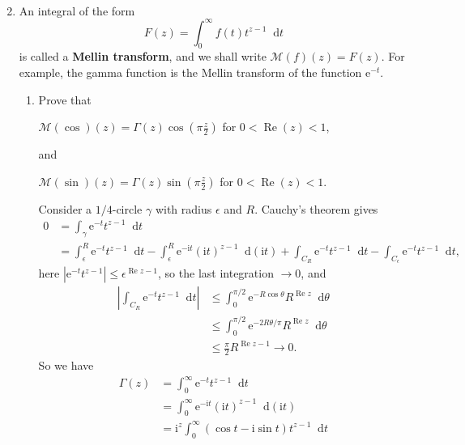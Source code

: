 \documentclass[11pt]{report}
\theoremstyle{mythm}
\let\oldendproof\endproof
\renewenvironment{proof}[1][\proofname]{%
  \oldproof[\normalfont \bfseries #1]%
}{\oldendproof}
\renewcommand*{\proofname}{Proof}
\theoremstyle{myans}
\newcommand{\mi}{\mathrm{i}}
\newcommand{\me}{\mathrm{e}}
\newcommand{\dd}{\mathop{}\!\mathrm{d}}
\renewcommand{\Re}{\operatorname{Re}}
\begin{document}
\begin{enumerate}
\begin{enumerate}
\begin{proof}
\begin{align*}
      \end{align*}
    \end{proof}
  \end{enumerate}
  \setcounter{enumi}{9}
  \item An integral of the form
  \[ F(z) = \int_0^\infty f(t) t^{z-1} \dd t \]
  is called a \textbf{Mellin transform}, and we shall write $\mathcal M(f)(z) = F(z)$. For example,
  the gamma function is the Mellin transform of the function $\me^{-t}$.
  \begin{enumerate}
    \item Prove that
    \begin{center}
      $\displaystyle\mathcal M(\cos)(z) = \Gamma(z) \cos \left(\pi \frac z 2\right)$
      \quad for $0 < \Re(z) < 1$,
    \end{center}
    and
    \begin{center}
      $\displaystyle\mathcal M(\sin)(z) = \Gamma(z) \sin \left(\pi \frac z 2\right)$
      \quad for $0 < \Re(z) < 1$.
    \end{center}
    \begin{proof}
      Consider a $1/4$-circle $\gamma$ with radius $\epsilon$ and $R$.
      Cauchy's theorem gives
      \begin{align*}
        0 &= \int_\gamma \me^{-t} t^{z-1} \dd t\\
        &= \int_\epsilon^R \me^{-t} t^{z-1} \dd t
        - \int_\epsilon^R \me^{-\mi t} (\mi t)^{z-1} \dd (\mi t)
        + \int_{C_R} \me^{-t} t^{z-1} \dd t - \int_{C_\epsilon}\me^{-t} t^{z-1} \dd t,
      \end{align*}
      here $|\me^{-t}t^{z-1}|\leq \epsilon^{\Re z - 1}$, so the last integration $\to 0$, and
      \begin{align*}
        \left| \int_{C_R} \me^{-t} t^{z-1} \dd t \right| &\leq 
        \int_0^{\pi/2} \me^{-R\cos \theta} R^{\Re z} \dd \theta\\
        &\leq \int_0^{\pi/2} \me^{-2R \theta / \pi} R^{\Re z} \dd \theta\\
        &\leq \frac{\pi}{2} R^{\Re z - 1} \to 0.
      \end{align*}
      So we have
      \begin{align*}
        \Gamma(z) &= \int_0^\infty \me^{-t} t^{z-1} \dd t\\
        &= \int_0^\infty \me^{-\mi t} (\mi t)^{z-1} \dd (\mi t)\\
        &= \mi^z \int_0^\infty (\cos t - \mi \sin t) t^{z-1} \dd t\\

\end{align*}
\end{proof}
\end{enumerate}
\end{enumerate}
\end{document}
